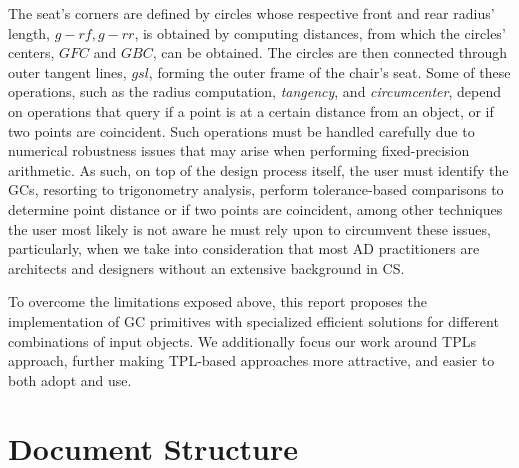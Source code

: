 The seat's corners are defined by circles whose respective front and rear
radius' length, $g-rf,g-rr$, is obtained by computing distances, from which the
circles' centers, $GFC$ and $GBC$, can be obtained.  The circles are then
connected through outer tangent lines, $gsl$, forming the outer frame of the
chair's seat.  Some of these operations, such as the radius computation,
\textit{tangency}, and \textit{circumcenter}, depend on operations that query if
a point is at a certain distance from an object, or if two points are
coincident.  Such operations must be handled carefully due to numerical
robustness issues that may arise when performing fixed-precision arithmetic.  As
such, on top of the design process itself, the user must identify the \acp{GC},
resorting to trigonometry analysis, perform tolerance-based comparisons to
determine point distance or if two points are coincident, among other techniques
the user most likely is not aware he must rely upon to circumvent these issues,
particularly, when we take into consideration that most \ac{AD} practitioners
are architects and designers without an extensive background in \ac{CS}.

To overcome the limitations exposed above, this report proposes the
implementation of \ac{GC} primitives with specialized efficient solutions for
different combinations of input objects.  We additionally focus our work around
\acp{TPL} approach, further making \ac{TPL}-based approaches more attractive,
and easier to both adopt and use.

\section{Document Structure}%
\label{sec:intro.structure}

